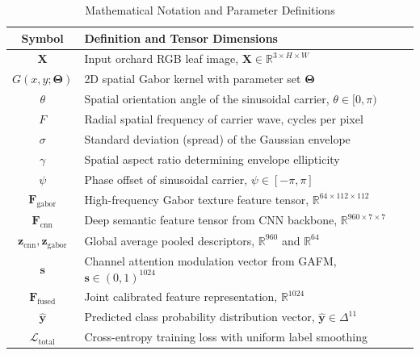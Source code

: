 \begin{table}[t]
\centering
\caption{Mathematical Notation and Parameter Definitions}
\label{tab:notation}
\begin{tabular}{cl}
\toprule
\textbf{Symbol} & \textbf{Definition and Tensor Dimensions} \\
\midrule
$\mathbf{X}$ & Input orchard RGB leaf image, $\mathbf{X} \in \mathbb{R}^{3 \times H \times W}$ \\
$G(x,y;\mathbf{\Theta})$ & 2D spatial Gabor kernel with parameter set $\mathbf{\Theta}$ \\
$\theta$ & Spatial orientation angle of the sinusoidal carrier, $\theta \in [0, \pi)$ \\
$F$ & Radial spatial frequency of carrier wave, cycles per pixel \\
$\sigma$ & Standard deviation (spread) of the Gaussian envelope \\
$\gamma$ & Spatial aspect ratio determining envelope ellipticity \\
$\psi$ & Phase offset of sinusoidal carrier, $\psi \in [-\pi, \pi]$ \\
$\mathbf{F}_{\text{gabor}}$ & High-frequency Gabor texture feature tensor, $\mathbb{R}^{64 \times 112 \times 112}$ \\
$\mathbf{F}_{\text{cnn}}$ & Deep semantic feature tensor from CNN backbone, $\mathbb{R}^{960 \times 7 \times 7}$ \\
$\mathbf{z}_{\text{cnn}}, \mathbf{z}_{\text{gabor}}$ & Global average pooled descriptors, $\mathbb{R}^{960}$ and $\mathbb{R}^{64}$ \\
$\mathbf{s}$ & Channel attention modulation vector from GAFM, $\mathbf{s} \in (0, 1)^{1024}$ \\
$\mathbf{F}_{\text{fused}}$ & Joint calibrated feature representation, $\mathbb{R}^{1024}$ \\
$\hat{\mathbf{y}}$ & Predicted class probability distribution vector, $\hat{\mathbf{y}} \in \Delta^{11}$ \\
$\mathcal{L}_{\text{total}}$ & Cross-entropy training loss with uniform label smoothing \\
\bottomrule
\end{tabular}
\end{table}

